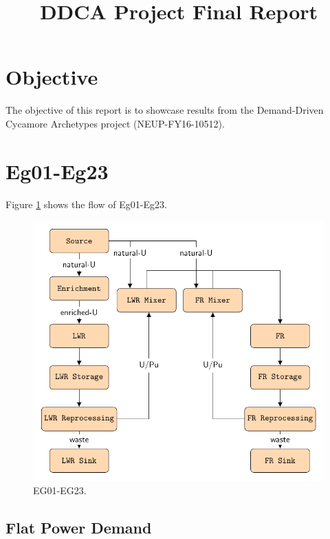\documentclass[11pt]{article}
\begin{document}
\title{DDCA Project Final Report}
\maketitle
\tableofcontents

\pagebreak

\section{Objective}
The objective of this report is to showcase results from the  
Demand-Driven Cycamore Archetypes project (NEUP-FY16-10512). 

\section{Eg01-Eg23}

Figure \ref{fig:23flow} shows the flow of Eg01-Eg23.

\begin{figure}[H]
	\centering
	\includegraphics[width=\textwidth]{23-figures/23flow.pdf} 
	\hfill
	\caption{EG01-EG23.}
	\label{fig:23flow}
\end{figure}

\subsection{Flat Power Demand}
\end{document}
